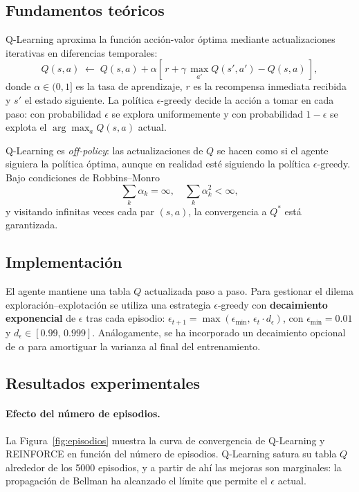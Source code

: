 \documentclass[11pt,a4paper]{article}
\begin{document}
\subsection{Fundamentos teóricos}

Q-Learning aproxima la función acción-valor óptima mediante actualizaciones iterativas en diferencias temporales:
\begin{equation}
  Q(s,a) \;\leftarrow\; Q(s,a) + \alpha\!\left[\,r + \gamma\,\max_{a'} Q(s',a') - Q(s,a)\,\right],
  \label{eq:qlearning}
\end{equation}
donde $\alpha\in(0,1]$ es la tasa de aprendizaje, $r$ es la recompensa inmediata recibida y $s'$ el estado siguiente. La política $\epsilon$-greedy decide la acción a tomar en cada paso: con probabilidad $\epsilon$ se explora uniformemente y con probabilidad $1-\epsilon$ se explota el $\arg\max_{a} Q(s,a)$ actual.

Q-Learning es \emph{off-policy}: las actualizaciones de $Q$ se hacen como si el agente siguiera la política óptima, aunque en realidad esté siguiendo la política $\epsilon$-greedy. Bajo condiciones de Robbins--Monro
$$\sum_k \alpha_k = \infty,\quad \sum_k \alpha_k^2 < \infty,$$
y visitando infinitas veces cada par $(s,a)$, la convergencia a $Q^{\ast}$ está garantizada.

\subsection{Implementación}

El agente mantiene una tabla $Q$ actualizada paso a paso. Para gestionar el dilema exploración--explotación se utiliza una estrategia $\epsilon$-greedy con \textbf{decaimiento exponencial} de $\epsilon$ tras cada episodio: $\epsilon_{t+1} = \max(\epsilon_{\min},\, \epsilon_t \cdot d_\epsilon)$, con $\epsilon_{\min}=0.01$ y $d_\epsilon\in[0.99,\,0.999]$. Análogamente, se ha incorporado un decaimiento opcional de $\alpha$ para amortiguar la varianza al final del entrenamiento.

\subsection{Resultados experimentales}

\paragraph{Efecto del número de episodios.} La Figura~\ref{fig:episodios} muestra la curva de convergencia de Q-Learning y REINFORCE en función del número de episodios. Q-Learning satura su tabla $Q$ alrededor de los 5000 episodios, y a partir de ahí las mejoras son marginales: la propagación de Bellman ha alcanzado el límite que permite el $\epsilon$ actual.
\end{document}
